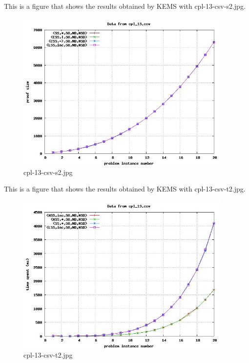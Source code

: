 This is a figure that shows the results obtained by KEMS with cpl-13-csv-s2.jpg.
\begin{figure}[htbp]
\begin{center}
\includegraphics[width=0.95\textwidth]{figuras/cpl-13-csv-s2.jpg}
\end{center}
\caption{cpl-13-csv-s2.jpg}
\end{figure}

This is a figure that shows the results obtained by KEMS with cpl-13-csv-t2.jpg.
\begin{figure}[htbp]
\begin{center}
\includegraphics[width=0.95\textwidth]{figuras/cpl-13-csv-t2.jpg}
\end{center}
\caption{cpl-13-csv-t2.jpg}
\end{figure}


